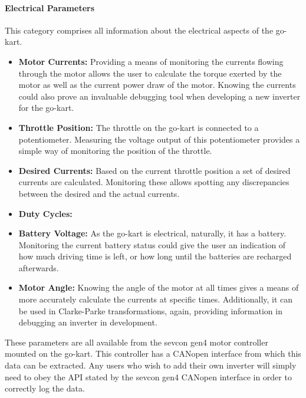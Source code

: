 \paragraph*{Electrical Parameters}
This category comprises all information about the electrical aspects of the go-kart.
\begin{itemize}
	\item \textbf{Motor Currents:} Providing a means of monitoring the currents flowing through the motor allows the user to calculate the torque exerted by the motor as well as the current power draw of the motor.
	Knowing the currents could also prove an invaluable debugging tool when developing a new inverter for the go-kart.
	\item \textbf{Throttle Position:} The throttle on the go-kart is connected to a potentiometer.
	Measuring the voltage output of this potentiometer provides a simple way of monitoring the position of the throttle.
	\item \textbf{Desired Currents:} Based on the current throttle position a set of desired currents are calculated.
	Monitoring these allows spotting any discrepancies between the desired and the actual currents.
	\item \textbf{Duty Cycles:}
	\item \textbf{Battery Voltage:} As the go-kart is electrical, naturally, it has a battery.
	Monitoring the current battery status could give the user an indication of how much driving time is left, or how long until the batteries are recharged afterwards.
	\item \textbf{Motor Angle:} Knowing the angle of the motor at all times gives a means of more accurately calculate the currents at specific times.
	Additionally, it can be used in Clarke-Parke transformations, again, providing information in debugging an inverter in development.
\end{itemize}
These parameters are all available from the sevcon gen4 motor controller mounted on the go-kart.
This controller has a CANopen interface from which this data can be extracted.
Any users who wish to add their own inverter will simply need to obey the API stated by the sevcon gen4 CANopen interface in order to correctly log the data.
